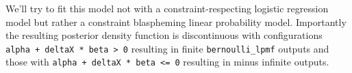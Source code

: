 \documentclass[
  letterpaper,
  DIV=11,
  numbers=noendperiod]{scrartcl}
\newenvironment{Shaded}{\begin{snugshade}}{\end{snugshade}}
\newcommand{\DecValTok}[1]{\textcolor[rgb]{0.68,0.00,0.00}{#1}}
\newcommand{\FunctionTok}[1]{\textcolor[rgb]{0.28,0.35,0.67}{#1}}
\newcommand{\NormalTok}[1]{\textcolor[rgb]{0.00,0.23,0.31}{#1}}
\newcommand{\OtherTok}[1]{\textcolor[rgb]{0.00,0.23,0.31}{#1}}
\newcommand{\SpecialCharTok}[1]{\textcolor[rgb]{0.37,0.37,0.37}{#1}}
\newcommand{\StringTok}[1]{\textcolor[rgb]{0.13,0.47,0.30}{#1}}
\begin{document}
\begin{Shaded}
\end{Shaded}

We'll try to fit this model not with a constraint-respecting logistic
regression model but rather a constraint blaspheming linear probability
model. Importantly the resulting posterior density function is
discontinuous with configurations
\texttt{alpha\ +\ deltaX\ *\ beta\ \textgreater{}\ 0} resulting in
finite \texttt{bernoulli\_lpmf} outputs and those with
\texttt{alpha\ +\ deltaX\ *\ beta\ \textless{}=\ 0} resulting in minus
infinite outputs.
\end{document}
